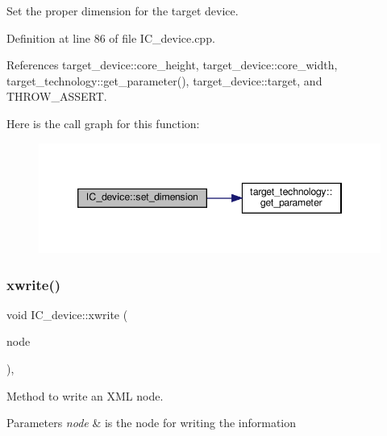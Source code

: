 Set the proper dimension for the target device. 



Definition at line 86 of file I\+C\+\_\+device.\+cpp.



References target\+\_\+device\+::core\+\_\+height, target\+\_\+device\+::core\+\_\+width, target\+\_\+technology\+::get\+\_\+parameter(), target\+\_\+device\+::target, and T\+H\+R\+O\+W\+\_\+\+A\+S\+S\+E\+RT.

Here is the call graph for this function\+:
\nopagebreak
\begin{figure}[H]
\begin{center}
\leavevmode
\includegraphics[width=346pt]{dc/d61/classIC__device_a973f958bd8b1823f0fb4a23dbd69871e_cgraph}
\end{center}
\end{figure}
\mbox{\label{classIC__device_a9f1d0aed8216506d868bcab429fe9536}} 
\subsubsection{\texorpdfstring{xwrite()}{xwrite()}}
{\footnotesize\ttfamily void I\+C\+\_\+device\+::xwrite (\begin{DoxyParamCaption}\item[{\hyperlink{classxml__element}{xml\+\_\+element} $\ast$}]{node }\end{DoxyParamCaption})\hspace{0.3cm}{\ttfamily [override]}, {\ttfamily [virtual]}}



Method to write an X\+ML node. 


\begin{DoxyParams}{Parameters}
{\em node} & is the node for writing the information \\
\hline
\end{DoxyParams}


